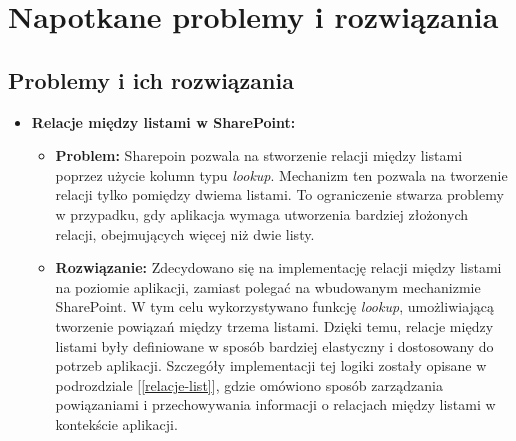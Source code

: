 \chapter{Napotkane problemy i rozwiązania}

\section*{Problemy i ich rozwiązania}

\begin{itemize}
    \item \textbf{Relacje między listami w SharePoint:}
          \begin{itemize}
              \item \textbf{Problem:} 
              Sharepoin pozwala na stworzenie relacji między listami poprzez użycie kolumn typu \emph{lookup}. Mechanizm ten pozwala na tworzenie relacji tylko pomiędzy dwiema listami. To ograniczenie stwarza problemy w przypadku, gdy aplikacja wymaga utworzenia bardziej złożonych relacji, obejmujących więcej niż dwie listy.
              \item \textbf{Rozwiązanie:} Zdecydowano się na implementację relacji między listami na poziomie aplikacji, zamiast polegać na wbudowanym mechanizmie SharePoint. W tym celu wykorzystywano funkcję \emph{lookup}, umożliwiającą tworzenie powiązań między trzema listami. Dzięki temu, relacje między listami były definiowane w sposób bardziej elastyczny i dostosowany do potrzeb aplikacji. Szczegóły implementacji tej logiki zostały opisane w podrozdziale [\ref{relacje-list}], gdzie omówiono sposób zarządzania powiązaniami i przechowywania informacji o relacjach między listami w kontekście aplikacji.
          \end{itemize}


\end{itemize}
